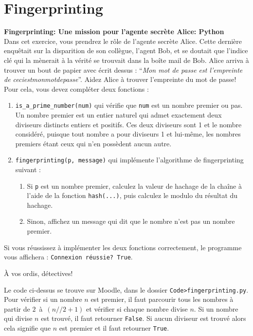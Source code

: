 \section{Fingerprinting}
\begin{Exercice}[15 minutes]\textbf{Fingerprinting: Une mission pour l'agente secrète Alice: Python}\\
    Dans cet exercice, vous prendrez le rôle de l'agente secrète Alice. Cette dernière enquêtait sur la disparition de son collègue,
    l'agent Bob, et se doutait que l'indice clé qui la mènerait à la vérité se trouvait dans la boîte mail de Bob. Alice arriva à trouver
    un bout de papier avec écrit dessus : ``\textit{Mon mot de passe est l'empreinte de ceciestmonmotdepasse}''. Aidez Alice à trouver l'empreinte du mot de passe! \\

    Pour cela, vous devez compléter deux fonctions :
    \begin{enumerate}
        \item \lstinline{is_a_prime_number(num)} qui vérifie que \lstinline{num} est un nombre premier ou pas. Un nombre premier est un entier naturel 
        qui admet exactement deux diviseurs distincts entiers et positifs. Ces deux diviseurs sont 1 et le nombre considéré, 
        puisque tout nombre a pour diviseurs 1 et lui-même, les nombres premiers étant ceux qui n’en possèdent aucun autre.
        
        \item \lstinline{fingerprinting(p, message)} qui implémente l'algorithme de fingerprinting suivant :
              \begin{enumerate}
                  \item Si \lstinline{p} est un nombre premier, calculez la valeur de hachage de la chaîne à l'aide de la fonction \lstinline{hash(...)}, puis calculez le modulo du résultat du hachage.
                  \item Sinon, affichez un message qui dit que le nombre n'est pas un nombre premier.    
              \end{enumerate}
    \end{enumerate}

    Si vous réussissez à implémenter les deux fonctions correctement, le programme vous affichera : \lstinline{Connexion réussie? True}.

    À vos ordis, détectives!

    
\begin{conseil}
Le code ci-dessus se trouve sur Moodle, dans le dossier \lstinline{Code>fingerprinting.py}.\\
Pour vérifier si un nombre $n$ est premier, il faut  parcourir tous les nombres à partir de $2$~à~$(n//2+1)$ et vérifier si chaque nombre divise $n$. Si un nombre qui divise $n$ est trouvé, il faut retourner \lstinline{False}. Si aucun diviseur est trouvé alors cela signifie que $n$ est premier et il faut retourner \lstinline{True}.
\end{conseil}


\end{Exercice}
